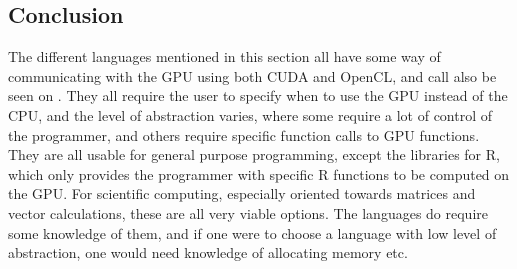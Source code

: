  

\subsection{Conclusion}  

The different languages mentioned in this section all have some way of communicating with the GPU using both CUDA and OpenCL, and call also be seen on  .
They all require the user to specify when to use the GPU instead of the CPU, and the level of abstraction varies, where some require a lot of control of the programmer, and others require specific function calls to GPU functions. 
They are all usable for general purpose programming, except the libraries for R, which only provides the programmer with specific R functions to be computed on the GPU.
For scientific computing, especially oriented towards matrices and vector calculations, these are all very viable options.
The languages do require some knowledge of them, and if one were to choose a language with low level of abstraction, one would need knowledge of allocating memory etc.

                     
